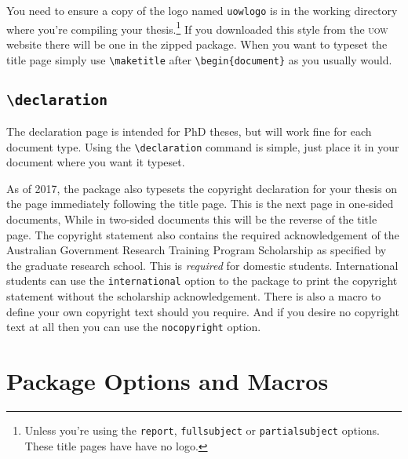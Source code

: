 \documentclass[12pt,oneside]{article}
\newcommand{\option}[1]{\texttt{\color{UOWblue}#1}}
\newcommand{\command}[1]{\texttt{\color{UOWred}#1}}
\newcommand{\comoptions}[1]{\texttt{\color{UOWdarkblue}#1}}
\begin{document}
You need to ensure a copy of the logo named \texttt{uow\textunderscore{}logo} is in the working directory where you're compiling your thesis.\footnote{Unless you're using the \option{report}, \option{fullsubject} or \option{partialsubject} options. These title pages have have no logo.} If you downloaded this style from the \textsc{uow} website there will be one in the zipped package. When you want to typeset the title page simply use \command{\textbackslash{}maketitle} after \command{\textbackslash{}begin}\comoptions{\{document\}} as you usually would.

\subsection*{\command{\textbackslash{}declaration}}
The declaration page is intended for PhD theses, but will work fine for each document type. Using the \command{\textbackslash{}declaration} command is simple, just place it in your document where you want it typeset. 

As of 2017, the package also typesets the copyright declaration for your thesis on the page immediately following the title page. This is the next page in one-sided documents, While in two-sided documents this will be the reverse of the title page. The copyright statement also contains the required acknowledgement of the Australian Government Research Training Program Scholarship as specified by the graduate research school. This is \emph{required} for domestic students. International students can use the \option{international} option to the package to print the copyright statement without the scholarship acknowledgement. There is also a macro to define your own copyright text should you require. And if you desire no copyright text at all then you can use the \option{nocopyright} option. 


\section{Package Options and Macros}
\end{document}
